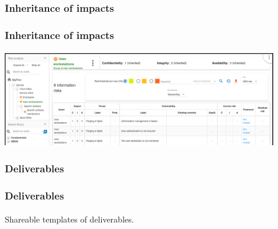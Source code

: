 \subsubsection{Inheritance of impacts}
\begin{frame}
    \frametitle{Inheritance of impacts}
    \framesubtitle{}
    \begin{center}
        \begin{center}
            \includegraphics[width=12cm]{../common_pictures/impacts-inheritance.png}
        \end{center}
    \end{center}
\end{frame}

\subsubsection{Deliverables}
\begin{frame}
    \frametitle{Deliverables}
    \framesubtitle{}
    Shareable templates of deliverables.
\end{frame}
